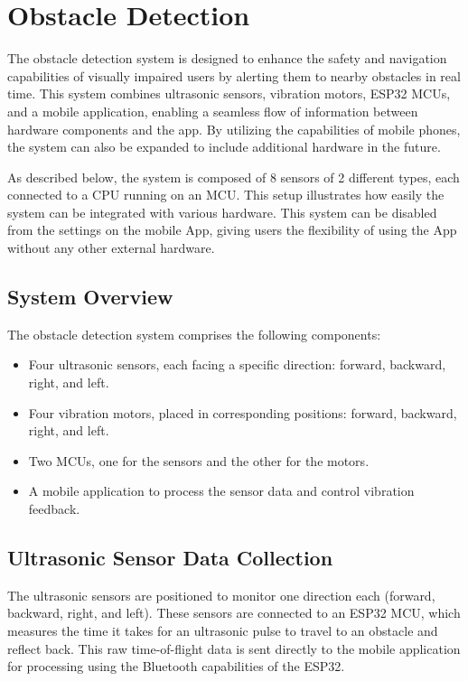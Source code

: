 \section{Obstacle Detection}
\label{Obstacle Detection Methodology Section}

The obstacle detection system is designed to enhance the safety and navigation capabilities of visually impaired users by alerting them to nearby obstacles in real time. This system combines ultrasonic sensors, vibration motors, ESP32 MCUs, and a mobile application, enabling a seamless flow of information between hardware components and the app. By utilizing the capabilities of mobile phones, the system can also be expanded to include additional hardware in the future.

As described below, the system is composed of 8 sensors of 2 different types, each connected to a CPU running on an MCU. This setup illustrates how easily the system can be integrated with various hardware. This system can be disabled from the settings on the mobile App, giving users the flexibility of using the App without any other external hardware.

\subsection{System Overview}

The obstacle detection system comprises the following components:

\begin{itemize}
	\item Four ultrasonic sensors, each facing a specific direction: forward, backward, right, and left.
	\item Four vibration motors, placed in corresponding positions: forward, backward, right, and left.
	\item Two MCUs, one for the sensors and the other for the motors.
	\item A mobile application to process the sensor data and control vibration feedback.
\end{itemize}

\subsection{Ultrasonic Sensor Data Collection}

The ultrasonic sensors are positioned to monitor one direction each (forward, backward, right, and left). These sensors are connected to an ESP32 MCU, which measures the time it takes for an ultrasonic pulse to travel to an obstacle and reflect back. This raw time-of-flight data is sent directly to the mobile application for processing using the Bluetooth capabilities of the ESP32.

